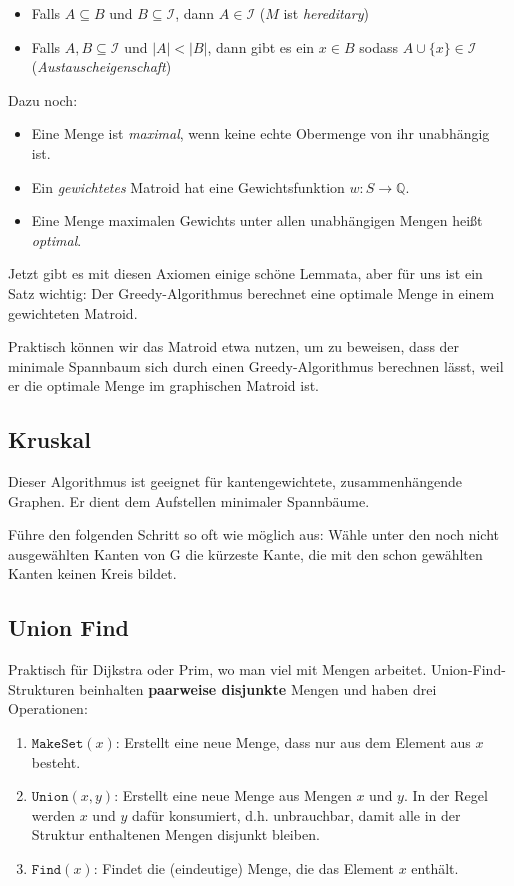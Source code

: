 \documentclass[11pt]{scrartcl}
\begin{document}
\begin{itemize}
\item Falls $A \subseteq B$ und $B \subseteq \mathcal{I}$, dann $A \in \mathcal{I}$ ($M$ ist \textit{hereditary})
\item Falls $A, B \subseteq \mathcal{I}$ und $|A| < |B|$, dann gibt es ein $x \in B$ sodass $A \cup \{x\} \in \mathcal{I}$ (\textit{Austauscheigenschaft})
\end{itemize}

Dazu noch:
\begin{itemize}
\item Eine Menge ist \textit{maximal}, wenn keine echte Obermenge von ihr unabhängig ist.
\item Ein \textit{gewichtetes} Matroid hat eine Gewichtsfunktion $w : S \to \mathbb{Q}$.
\item Eine Menge maximalen Gewichts unter allen unabhängigen Mengen heißt \textit{optimal}.
\end{itemize}

Jetzt gibt es mit diesen Axiomen einige schöne Lemmata, aber für uns ist ein Satz wichtig: Der Greedy-Algorithmus berechnet eine optimale Menge in einem gewichteten Matroid.

Praktisch können wir das Matroid etwa nutzen, um zu beweisen, dass der minimale Spannbaum sich durch einen Greedy-Algorithmus berechnen lässt, weil er die optimale Menge im graphischen Matroid ist.

\subsection{Kruskal}
Dieser Algorithmus ist geeignet für kantengewichtete, zusammenhängende Graphen. Er dient dem Aufstellen minimaler Spannbäume.

Führe den folgenden Schritt so oft wie möglich aus: Wähle unter den noch nicht ausgewählten Kanten von G die kürzeste Kante, die mit den schon gewählten Kanten keinen Kreis bildet.

\subsection{Union Find}

Praktisch für Dijkstra oder Prim, wo man viel mit Mengen arbeitet.
Union-Find-Strukturen beinhalten \textbf{paarweise disjunkte} Mengen und haben drei Operationen:

\begin{enumerate}
\item $\texttt{MakeSet}(x)$: Erstellt eine neue Menge, dass nur aus dem Element aus $x$ besteht.
\item $\texttt{Union}(x,y)$: Erstellt eine neue Menge aus Mengen $x$ und $y$. In der Regel werden $x$ und $y$ dafür konsumiert, d.h. unbrauchbar, damit alle in der Struktur enthaltenen Mengen disjunkt bleiben.
\item $\texttt{Find}(x)$: Findet die (eindeutige) Menge, die das Element $x$ enthält.
\end{enumerate}
\end{document}
